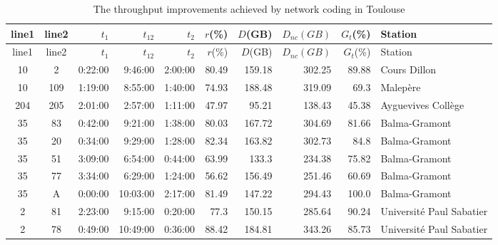 \documentclass[twoside,12pt]{article}
\begin{document}
\begin{footnotesize}

\setlength{\tabcolsep}{3pt}



\begin{longtable}{|c|c|r|r|r|r|r|r|r|l|}
	\caption{The throughput improvements achieved by network coding in Toulouse}
	\label{table:throughput improvement 2} \\ 		%
	\hline
	line1	&	line2	&	$t_1$		&	$t_{12}$	&	$t_2$		&	$r$(\%)&	$D$(GB)&	$D_{nc}(GB)$&$G_t$(\%)&Station\\	
	\hline
	\endfirsthead
	\hline
	line1	&	line2	&	$t_1$		&	$t_{12}$	&	$t_2$		&	$r$(\%)&	$D$(GB)&	$D_{nc}(GB)$&$G_t$(\%)&Station\\	
	\hline
	\endhead 
	\hline
	\endfoot 
	10	&	2		&	0:22:00	&	9:46:00	&	2:00:00	&	80.49	&	159.18	&	302.25	&	89.88	&	Cours Dillon	\\
	10	&	109	&	1:19:00	&	8:55:00	&	1:40:00	&	74.93	&	188.48	&	319.09	&	69.3	&	Malepère	\\
	204	&	205	&	2:01:00	&	2:57:00	&	1:11:00	&	47.97	&	95.21	&	138.43	&	45.38	&	Ayguevives Collège	\\
	35	&	83	&	0:42:00	&	9:21:00	&	1:38:00	&	80.03	&	167.72	&	304.69	&	81.66	&	Balma-Gramont	\\
	35	&	20	&	0:34:00	&	9:29:00	&	1:28:00	&	82.34	&	163.82	&	302.73	&	84.8	&	Balma-Gramont	\\
	35	&	51	&	3:09:00	&	6:54:00	&	0:44:00	&	63.99	&	133.3	&	234.38	&	75.82	&	Balma-Gramont	\\
	35	&	77	&	3:34:00	&	6:29:00	&	1:24:00	&	56.62	&	156.49	&	251.46	&	60.69	&	Balma-Gramont	\\
	35	&	A	&	0:00:00	&	10:03:00	&	2:17:00	&	81.49	&	147.22	&	294.43	&	100.0	&	Balma-Gramont	\\
	2	&	81	&	2:23:00	&	9:15:00	&	0:20:00	&	77.3	&	150.15	&	285.64	&	90.24	&	Université Paul Sabatier	\\
	2	&	78	&	0:49:00	&	10:49:00	&	0:36:00	&	88.42	&	184.81	&	343.26	&	85.73	&	Université Paul Sabatier	\\

\end{longtable}
\end{footnotesize}
\end{document}
